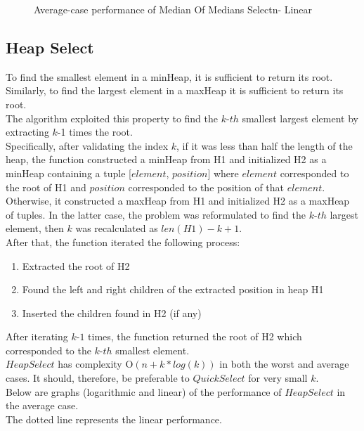 \documentclass{article}
\begin{document}
\begin{figure}[H]   %
  \caption{Average-case performance of Median Of Medians Selectn- Linear}
\end{figure}

\subsection{Heap Select}
To find the smallest element in a minHeap, it is sufficient to return its root. Similarly, to find the largest element in a maxHeap it is sufficient to return its root.\\
The algorithm exploited this property to find the $k$-$th$ smallest largest element by extracting $k$-1 times the root.\\
Specifically, after validating the index $k$, if it was less than half the length of the heap, the function constructed a minHeap from H1 and initialized H2 as a minHeap containing a tuple [$element$, $position$] where $element$
corresponded to the root of H1 and $position$ corresponded to the position of that $element$.\\
Otherwise, it constructed a maxHeap from H1 and initialized H2 as a maxHeap of tuples. In the latter case, the problem was reformulated to find the $k$-$th$ largest element, then $k$ was recalculated as $len(H1)-k+1$.\\
After that, the function iterated the following process:
\begin{enumerate}
    \item Extracted the root of H2
    \item Found the left and right children of the extracted position in heap H1
    \item Inserted the children found in H2 (if any)
\end{enumerate}
After iterating $k$-$1$ times, the function returned the root of H2 which corresponded to the $k$-$th$ smallest element. \\
$HeapSelect$ has complexity O$(n+k*log(k))$ in both the worst and average cases. It should, therefore, be preferable to $QuickSelect$ for very small $k$.\\
Below are graphs (logarithmic and linear) of the performance of $HeapSelect$ in the average case. \\
The dotted line represents the linear performance.
\end{document}
